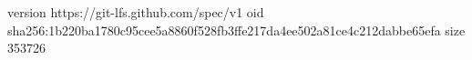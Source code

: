 version https://git-lfs.github.com/spec/v1
oid sha256:1b220ba1780c95cee5a8860f528fb3ffe217da4ee502a81ce4c212dabbe65efa
size 353726
